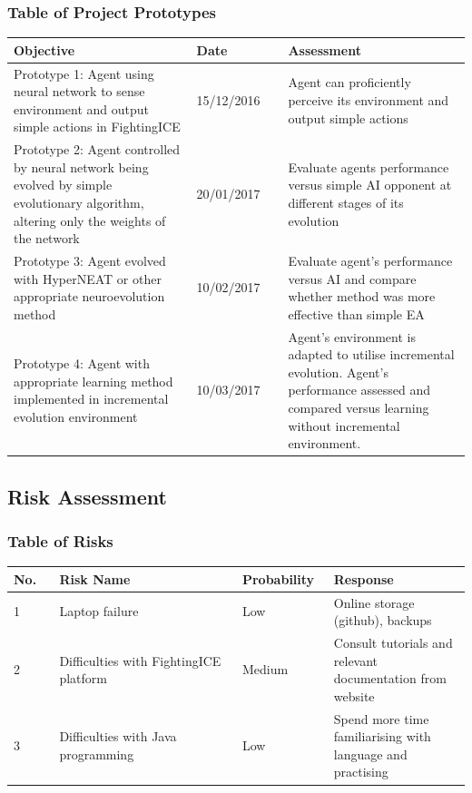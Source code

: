 \documentclass[11pt,a4paper]{article}
\begin{document}
\subsubsection{Table of Project Prototypes}
\begin{tabular}{|p{0.4\linewidth}|p{0.2\linewidth}|p{0.4\linewidth}|}
\hline
Objective & Date & Assessment\\ \hline
Prototype 1: Agent using neural network to sense environment and output simple actions in FightingICE & 15/12/2016 & Agent can proficiently perceive its environment and output simple actions\\ \hline
Prototype 2: Agent controlled by neural network being evolved by simple evolutionary algorithm, altering only the weights of the network & 20/01/2017 & Evaluate agents performance versus simple AI opponent at different stages of its evolution\\ \hline
Prototype 3: Agent evolved with HyperNEAT or other appropriate neuroevolution method & 10/02/2017 & Evaluate agent's performance versus AI and compare whether method was more effective than simple EA\\ \hline
Prototype 4: Agent with appropriate learning method implemented in incremental evolution environment & 10/03/2017 & Agent's environment is adapted to utilise incremental evolution. Agent's performance assessed and compared versus learning without incremental environment.\\ \hline
\end{tabular}
\newpage
\subsection{Risk Assessment}
\subsubsection{Table of Risks}
\begin{tabular}{|p{0.1\linewidth}|p{0.4\linewidth}|p{0.2\linewidth}|p{0.3\linewidth}|}
\hline
No. & Risk Name & Probability & Response\\ \hline
1 & Laptop failure & Low & Online storage (github), backups\\ \hline
2 & Difficulties with FightingICE platform & Medium & Consult tutorials and relevant documentation from website\\ \hline
3 & Difficulties with Java programming & Low & Spend more time familiarising with language and practising\\ \hline
\end{tabular}
\newpage
\end{document}
